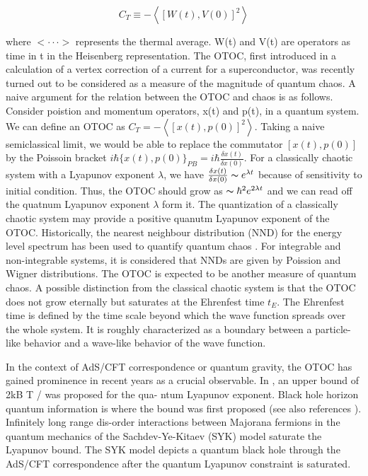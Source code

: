 \documentclass[12pt]{report}
\newcommand*{\1}{\hspace{1pt}}
\begin{document}
    \begin{equation}
        C_{T} \equiv  - \left\langle\left[W(t),V(0)\right]^{2}\right\rangle
    \end{equation}

    where $<\cdot \cdot \cdot >$ represents the thermal average. W(t) and V(t) are operators as time in t in the Heisenberg representation. The OTOC, first introduced
    in a calculation of a vertex correction of a current for a superconductor\cite{s12}, was recently turned out to be considered as a measure of the magnitude of 
    quantum chaos. A naive argument for the relation between the OTOC and chaos is as follows\cite{s13}. Consider poistion and momentum operators, x(t) and p(t), in a
    quantum system. We can define an OTOC as $C_{T} = - \left\langle\left[x(t),p(0)\right]^{2}\right\rangle$. Taking a naive semiclassical limit, we would be able to 
    replace the commutator $\left[x(t),p(0)\right]$ by the Poissoin bracket $i\hbar\{x(t),p(0)\}_{PB} = i\hbar\frac{\delta x(t)}{\delta x(0)}$. For a classically 
    chaotic system with a Lyapunov exponent $\lambda$, we have $\frac{\delta x(t)}{\delta x(0)}\thicksim  e^{\lambda t}$ because of sensitivity to initial condition.
    Thus, the OTOC should grow as $\thicksim \hbar^{2}e^{2\lambda t}$ and we can read off the quatnum Lyapunov exponent $\lambda$ form it. The quantization of a 
    classically chaotic system may provide a positive quanutm Lyapunov exponent of the OTOC. Historically, the nearest neighbour distribution (NND) for the energy
    level spectrum has been used to quantify quantum chaos \cite{s14}. For integrable and non-integrable systems, it is considered that NNDs are given by Poission
    and Wigner distributions. The OTOC is expected to be another measure of quantum chaos. A possible distinction from the classical chaotic system is that the 
    OTOC does not grow eternally but saturates at the Ehrenfest time $t_{E}$. The Ehrenfest time is defined by the time scale beyond which the wave function spreads
    over the whole system. It is roughly characterized as a boundary between a particle-like behavior and a wave-like behavior of the wave function.

    In the context of AdS/CFT correspondence \cite{s16} or quantum gravity, the OTOC has gained prominence in recent years as a crucial observable. In \cite{s17}, 
    an upper bound of 2kB T / was proposed for the qua- ntum Lyapunov exponent. Black hole horizon quantum information is where the bound was first proposed \cite{s18,s19} (see
    also references \cite{s20,s21,s22,s23,s24}). Infinitely long range dis-order interactions between Majorana fermions in the quantum mechanics of the Sachdev-Ye-Kitaev (SYK) model 
    \cite{s25,s26} saturate the Lyapunov bound. The SYK model depicts a quantum black hole through the AdS/CFT correspondence after the quantum Lyapunov constraint is saturated.
\end{document}
